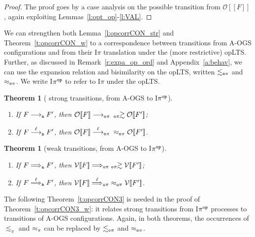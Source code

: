 \documentclass[11pt,a4paper]{amsart}
\theoremstyle{plain}
\theoremstyle{definition}
\theoremstyle{defC}
\theoremstyle{thmC}
\theoremstyle{plain}
\numberwithin{equation}{section}
\newcommand{\AOGS}{\mbox{{\rm A-OGS}}\xspace}      %
\newcommand{\rmm}[1]{{\tt{\lowercase{#1}}}}
\newcommand{\genarr}[2]{\mathrel{\stackrel{{#1}}{\longrightarrow}_{\rmm{\lowercase{#2}}}}}
\newcommand{\genArr}[2]{\mathrel{\stackrel{{#1}}{\Longrightarrow}_{\rmm{\lowercase{#2}}}}}  %
\newcommand{\genlongrightarrow}[1]{\mathrel{\longrightarrow_{\rmm{\lowercase{#1}}}}}
\newcommand{\genLongrightarrow}[1]{\mathrel{\Longrightarrow_{\rmm{\lowercase{#1}}}}}
\newcommand{\arrA}[1]{\genarr{#1}{A}}  %
\newcommand{\ArrA}[1]{\genArr{#1}{A}}  %
\newcommand{\longrightarrowA}{\genlongrightarrow{A}}
\newcommand{\LongrightarrowA}{\genLongrightarrow{A}}
\newcommand{\arrN}[1]{\genarr{#1}{o\pi}}  %
\newcommand{\ArrN}[1]{\genArr{#1}{o\pi}}  %
\newcommand{\raN}{\arrN{}}
\newcommand{\RaN}{\ArrN{}}
\newcommand{\opLTS}{opLTS\xspace}  %
\newcommand{\genwb}[1]{\mathrel{\approx_{\rmm{\lowercase{#1}}}}}       %
\newcommand{\wbPI}{\genwb{\pi}}       %
\newcommand{\wbOPI}{\genwb{o\pi}}       %
\newcommand{\expa}{\mathrel{\lesssim_{\pi}}}
\newcommand{\expaOP}{\mathrel{\lesssim_{\rmm{o}\pi}}} %
\newcommand{\contrOP}{\mathrel{\mbox{}_{\rmm{o}\pi}\!\!\gtrsim}}
\newcommand{\FF}{F}
\newcommand{\cbvSymb}{{\mathcal {V}}}
\newcommand{\encoEnvI}[1]{ \cbvSymb[\! [ #1 ] \! ]  } %
\newcommand{\encoConI}{\encoEnvI} %
\newcommand{\encoEnvV}[1]{{\mathcal {O}} [\! [ #1 ] \! ]  } %
\newcommand{\encoConV}{\encoEnvV} %
\newcommand{\Intp}{\mbox{I$\pi$}\xspace}   %
\newcommand{\piI}{\Intp}   %
\newcommand{\piIop}{\mbox{I$\pi^{\rmm{op}}$}\xspace}   %
\theoremstyle{plain}
\newtheorem{theorem}[thm]{Theorem}
\theoremstyle{definition}
\begin{document}
\begin{proof}
The proof goes by a case analysis on the possible transition from 
$ \encoConV \FF$, again 
exploiting Lemmas~\ref{l:opt_op}-\ref{l:VAL}.
\end{proof} 
\noindent
We can strengthen both  
Lemma~\ref{l:opcorrCON_str} and 
Theorem~\ref{t:opcorrCON_w}
 to a correspondence between transitions from
\AOGS configurations and from their \piI translation under the (more
restrictive) \opLTS.  
Further, as discussed in Remark~\ref{r:expa_op_ord} and
Appendix~\ref{a:behav}, we can use the expansion relation and
bisimilarity on the
\opLTS, written $\expaOP$ and $\wbOPI$. 
We write \piIop to refer to \piI under the \opLTS.



\begin{theorem}[%
strong transitions, from \AOGS to \piIop]
\label{t:opcorrCON_str_OP}
$ $ \begin{enumerate}

\item If $\FF \longrightarrowA \FF'$, then 
$ \encoConV \FF \raN  \; \: \contrOP  \encoConV {\FF'}$;


\item If $\FF \arrA\ell \FF'$, then
$ \encoConV \FF \arrN\ell  
\; \: \wbOPI 
\encoConV {\FF'}$.
\end{enumerate} 
\end{theorem} 


\begin{theorem} %
[weak transitions, from \AOGS to \piIop]
\label{t:opcorrCON_w_OP}
$ $ \begin{enumerate}

\item If $\FF \LongrightarrowA \FF'$, then 
$\encoConI \FF \RaN  \; \contrOP \encoConI {\FF'}$;


\item If $\FF \ArrA\ell \FF'$, then
$ \encoConI \FF \ArrN\ell  
\; \wbOPI
\encoConI {\FF'}$.
\end{enumerate} 
\end{theorem} 
\noindent
The following Theorem~\ref{t:opcorrCON3}  is needed in the proof of Theorem~\ref{t:opcorrCON3_w}:
it relates strong transitions from  \piIop processes to
transitions of \AOGS configurations. 
Again, in both theorems, the occurrences of $\expa$ and $\wbPI$ can be
replaced by $\expaOP$ and $\wbOPI$. 
\end{document}
